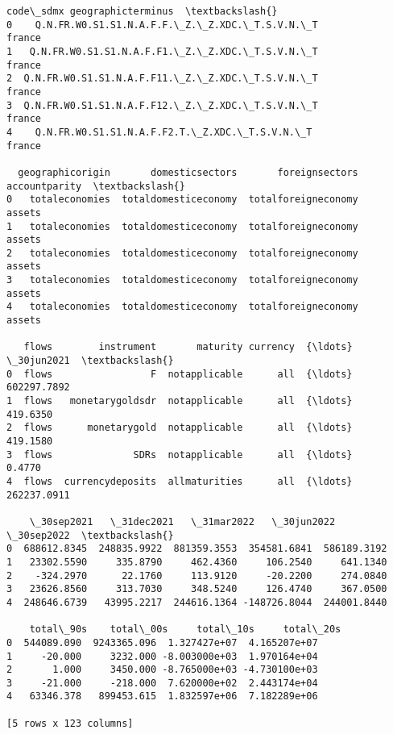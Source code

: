 \documentclass[11pt]{article}
\begin{document}
    \begin{Verbatim}[commandchars=\\\{\}]
                                         code\_sdmx geographicterminus  \textbackslash{}
0    Q.N.FR.W0.S1.S1.N.A.F.F.\_Z.\_Z.XDC.\_T.S.V.N.\_T             france
1   Q.N.FR.W0.S1.S1.N.A.F.F1.\_Z.\_Z.XDC.\_T.S.V.N.\_T             france
2  Q.N.FR.W0.S1.S1.N.A.F.F11.\_Z.\_Z.XDC.\_T.S.V.N.\_T             france
3  Q.N.FR.W0.S1.S1.N.A.F.F12.\_Z.\_Z.XDC.\_T.S.V.N.\_T             france
4    Q.N.FR.W0.S1.S1.N.A.F.F2.T.\_Z.XDC.\_T.S.V.N.\_T             france

  geographicorigin       domesticsectors       foreignsectors accountparity  \textbackslash{}
0   totaleconomies  totaldomesticeconomy  totalforeigneconomy        assets
1   totaleconomies  totaldomesticeconomy  totalforeigneconomy        assets
2   totaleconomies  totaldomesticeconomy  totalforeigneconomy        assets
3   totaleconomies  totaldomesticeconomy  totalforeigneconomy        assets
4   totaleconomies  totaldomesticeconomy  totalforeigneconomy        assets

   flows        instrument       maturity currency  {\ldots}   \_30jun2021  \textbackslash{}
0  flows                 F  notapplicable      all  {\ldots}  602297.7892
1  flows   monetarygoldsdr  notapplicable      all  {\ldots}     419.6350
2  flows      monetarygold  notapplicable      all  {\ldots}     419.1580
3  flows              SDRs  notapplicable      all  {\ldots}       0.4770
4  flows  currencydeposits  allmaturities      all  {\ldots}  262237.0911

    \_30sep2021   \_31dec2021   \_31mar2022   \_30jun2022   \_30sep2022  \textbackslash{}
0  688612.8345  248835.9922  881359.3553  354581.6841  586189.3192
1   23302.5590     335.8790     462.4360     106.2540     641.1340
2    -324.2970      22.1760     113.9120     -20.2200     274.0840
3   23626.8560     313.7030     348.5240     126.4740     367.0500
4  248646.6739   43995.2217  244616.1364 -148726.8044  244001.8440

    total\_90s    total\_00s     total\_10s     total\_20s
0  544089.090  9243365.096  1.327427e+07  4.165207e+07
1     -20.000     3232.000 -8.003000e+03  1.970164e+04
2       1.000     3450.000 -8.765000e+03 -4.730100e+03
3     -21.000     -218.000  7.620000e+02  2.443174e+04
4   63346.378   899453.615  1.832597e+06  7.182289e+06

[5 rows x 123 columns]
    \end{Verbatim}
\end{document}
